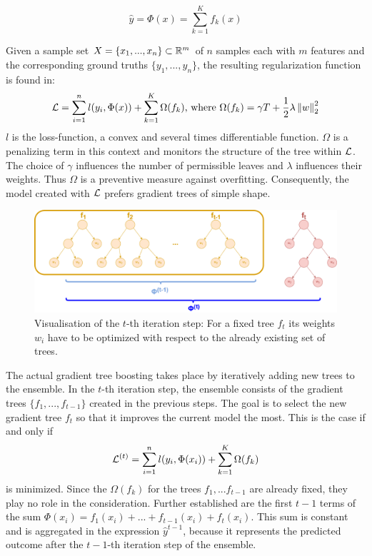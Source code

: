 $$\hat{y} = \Phi(x) = \sum_{k=1}^{K} f_k(x)$$

Given a sample set $X= \{x_1, ..., x_n\} \subset \mathbb{R}^{m} $ of $n$ samples each with $m$ features and the corresponding ground truths $\{y_1, ... ,y_n\}$, the resulting regularization function is found in:	
$$\mathcal{L} = \sum_{i=1}^{n} l(y_i, \Phi(x)) + \sum_{k=1}^{K}\Omega(f_k) \text{,  where } \Omega(f_k) = \gamma T + \frac{1}{2}\lambda \left\| w \right\|_2^2$$
$l$ is the loss-function, a convex and several times differentiable function. $\Omega$ is a penalizing term in this context and monitors the structure of the tree within $\mathcal{L}$. The choice of $\gamma$ influences the number of permissible leaves and $\lambda$ influences their weights. Thus $\Omega$ is a preventive measure against overfitting. Consequently, the model created with $\mathcal{L}$ prefers gradient trees of simple shape.

\begin{figure}[H]
	\begin{center}
		\includegraphics[width=\textwidth]{images/gradient_boosting.png}
		\caption{Visualisation of the $t$-th iteration step: For a fixed tree $f_t$ its weights $w_i$ have to be optimized with respect to the already existing set of trees.}
		\label{abb:gradient_boosting}
	\end{center}		
\end{figure}
The actual gradient tree boosting takes place by iteratively adding new trees to the ensemble. In the $t$-th iteration step, the ensemble consists of the gradient trees $\{f_1, ... , f_{t-1}\}$ created in the previous steps. The goal is to select the new gradient tree $f_t$ so that it improves the current model the most. This is the case if and only if 
\begin{equation}
\mathcal{L}^{(t)} = \sum_{i=1}^{n} l(y_i, \Phi(x_i)) + \sum_{k=1}^{K}\Omega(f_k)
\label{eq:LL1}
\end{equation}
is minimized. Since the $\Omega(f_k)$ for the trees $f_1, ... f_{t-1}$ are already fixed, they play no role in the consideration. Further established are the first $t-1$ terms of the sum $\Phi(x_i) = f_1(x_i) + ... + f_{t-1}(x_i) + f_t(x_i)$. This sum is constant and is aggregated in the expression $\hat{y}^{t-1}$, because it represents the predicted outcome after the $t-1$-th iteration step of the ensemble.

